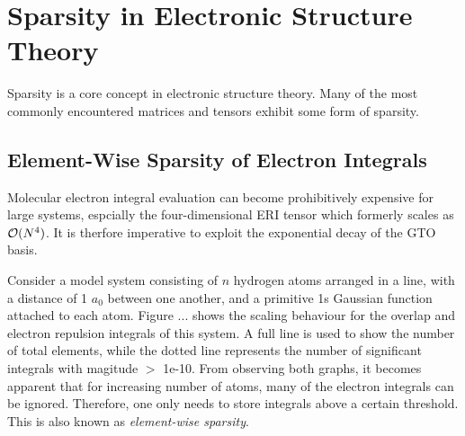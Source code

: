 \section{Sparsity in Electronic Structure Theory}

Sparsity is a core concept in electronic structure theory. Many of the most commonly encountered matrices and tensors exhibit some form of sparsity. 

\FloatBarrier

\subsection{Element-Wise Sparsity of Electron Integrals}

Molecular electron integral evaluation can become prohibitively expensive for large systems, espcially the four-dimensional ERI tensor which formerly scales as $\mathcal{O}(N^{4})$. It is therfore imperative to exploit the exponential decay of the GTO basis.

Consider a model system consisting of $n$ hydrogen atoms arranged in a line, with a distance of 1 $a_0$ between one another, and a primitive 1s Gaussian function attached to each atom. Figure ... shows the scaling behaviour for the overlap and electron repulsion integrals of this system. A full line is used to show the number of total elements, while the dotted line represents the number of significant integrals with magitude $>$ 1e-10. From observing both graphs, it becomes apparent that for increasing number of atoms, many of the electron integrals can be ignored. Therefore, one only needs to store integrals above a certain threshold. This is also known as \emph{element-wise sparsity}.

